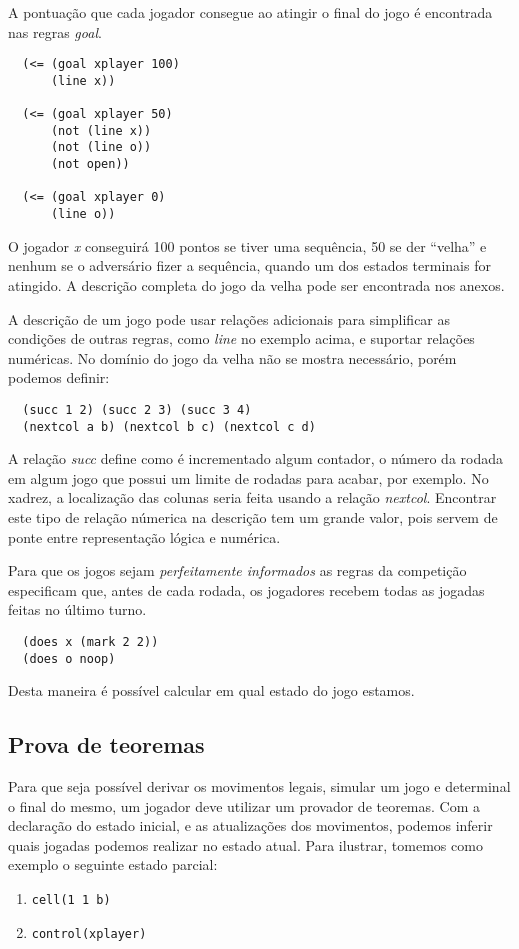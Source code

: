 A pontuação que cada jogador consegue ao atingir o final do jogo é encontrada
nas regras {\it goal}.
\begin{verbatim}
  (<= (goal xplayer 100)
      (line x))
 
  (<= (goal xplayer 50)
      (not (line x))
      (not (line o))
      (not open))
 
  (<= (goal xplayer 0)
      (line o))
\end{verbatim}
O jogador {\it x} conseguirá 100 pontos se tiver uma sequência, 50 se der
``velha'' e nenhum se o adversário fizer a sequência, quando um dos estados
terminais for atingido. A descrição completa do jogo da velha pode ser
encontrada nos anexos.

A descrição de um jogo pode usar relações adicionais para simplificar as
condições de outras regras, como {\it line} no exemplo acima, e suportar
relações numéricas. No domínio do jogo da velha não se mostra necessário, porém
podemos definir: 
\begin{verbatim}
  (succ 1 2) (succ 2 3) (succ 3 4)
  (nextcol a b) (nextcol b c) (nextcol c d)
\end{verbatim}
A relação {\it succ} define como é incrementado algum contador, o número da
rodada em algum jogo que possui um limite de rodadas para acabar, por
exemplo. No xadrez, a localização das colunas seria feita usando a relação {\it
  nextcol}. Encontrar este tipo de relação númerica na descrição tem um grande 
valor, pois servem de ponte entre representação lógica e numérica.


Para que os jogos sejam {\it perfeitamente informados} as regras da competição
especificam que, antes de cada rodada, os jogadores recebem todas as jogadas
feitas no último turno.
\begin{verbatim}
  (does x (mark 2 2))
  (does o noop)
\end{verbatim}
Desta maneira é possível calcular em qual estado do jogo estamos.

\subsection{Prova de teoremas}
Para que seja possível derivar os movimentos legais, simular um jogo e
determinal o final do mesmo, um jogador deve utilizar um provador de
teoremas. Com a declaração do estado inicial, e as atualizações dos movimentos,
podemos inferir quais jogadas podemos realizar no estado atual. Para ilustrar,
tomemos como exemplo o seguinte estado parcial:
\begin{enumerate}
  \item \verb|cell(1 1 b)|
  \item \verb|control(xplayer)|
\end{enumerate}

